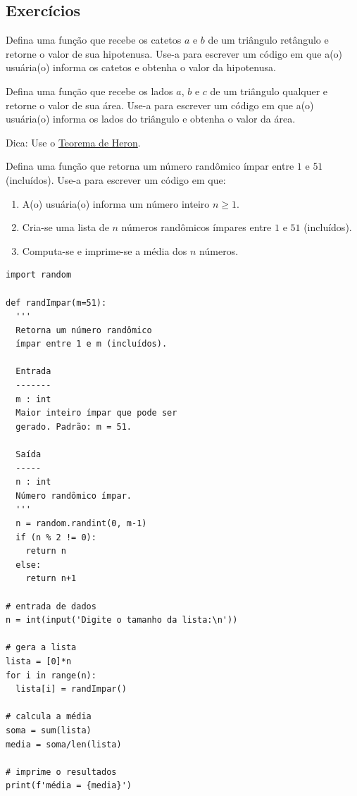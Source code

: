 \subsection{Exercícios}

\begin{exer}
  Defina uma função que recebe os catetos $a$ e $b$ de um triângulo retângulo e retorne o valor de sua hipotenusa. Use-a para escrever um código em que a(o) usuária(o) informa os catetos e obtenha o valor da hipotenusa.
\end{exer}

\begin{exer}
  Defina uma função que recebe os lados $a$, $b$ e $c$ de um triângulo qualquer e retorne o valor de sua área. Use-a para escrever um código em que a(o) usuária(o) informa os lados do triângulo e obtenha o valor da área.  
\end{exer}
\begin{resp}
  Dica: Use o \href{https://pt.wikipedia.org/wiki/Teorema\_de\_Her\%C3\%A3o}{Teorema de Heron}.
\end{resp}

\begin{exer}
  Defina uma função que retorna um número randômico ímpar entre $1$ e $51$ (incluídos). Use-a para escrever um código em que:
  \begin{enumerate}[1.]
  \item A(o) usuária(o) informa um número inteiro $n\geq 1$.
  \item Cria-se uma lista de $n$ números randômicos ímpares entre $1$ e $51$ (incluídos).
  \item Computa-se e imprime-se a média dos $n$ números.
  \end{enumerate}
\end{exer}
\begin{resp}

\begin{lstlisting}
import random

def randImpar(m=51):
  '''
  Retorna um número randômico
  ímpar entre 1 e m (incluídos).

  Entrada
  -------
  m : int
  Maior inteiro ímpar que pode ser 
  gerado. Padrão: m = 51.

  Saída
  -----
  n : int
  Número randômico ímpar.
  '''
  n = random.randint(0, m-1)
  if (n % 2 != 0):
    return n
  else:
    return n+1

# entrada de dados
n = int(input('Digite o tamanho da lista:\n'))

# gera a lista
lista = [0]*n
for i in range(n):
  lista[i] = randImpar()

# calcula a média
soma = sum(lista)
media = soma/len(lista)

# imprime o resultados
print(f'média = {media}')
\end{lstlisting}

\end{resp}

